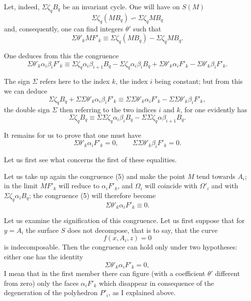 \documentclass{article}
\begin{document}
Let, indeed, $\Sigma \zeta_{q} B_{q}$ be an invariant cycle. One will have on $S(M)$
\[ \Sigma \zeta_{q} (MB_{q}) \backsim \Sigma \zeta_{q} MB_{q} \tag{6} \]
and, consequently, one can find integers $\theta'$ such that
\[ \Sigma \theta'_{k} MF'_{k} \equiv \Sigma \zeta_{q} (MB_{q}) - \Sigma \zeta_{q} MB_{q}. \tag{5} \]

One deduces from this the congruence
\[ \Sigma \theta'_{k} \alpha_{i}\beta_{i}F'_{k} \equiv \Sigma \zeta_{q} \alpha_{i}\beta_{i+1}B_{q} - \Sigma \zeta_{q} \alpha_{i}\beta_{i}B_{q} + \Sigma \theta'_{k} \alpha_{i}F'_{k} - \Sigma \theta'_{k} \beta_{i}F'_{k}. \]

The sign $\Sigma$ refers here to the index $k$, the index $i$ being constant; but from this we can deduce
\[ \Sigma \zeta_{q} B_{q} + \Sigma \Sigma \theta'_{k} \alpha_{i}\beta_{i}F'_{k} \equiv \Sigma \Sigma \theta'_{k} \alpha_{i}F'_{k} - \Sigma \Sigma \theta'_{k} \beta_{i}F'_{k}, \]
the double sign $\Sigma$ then referring to the two indices $i$ and $k$, for one evidently has
\[ \Sigma \zeta_{q} B_{q} \equiv \Sigma \Sigma \zeta_{q} \alpha_{i}\beta_{i}B_{q} - \Sigma \Sigma \zeta_{q} \alpha \beta_{i+1}B_{q}. \]


It remains for us to prove that one must have
\[ \Sigma \theta'_{k} \alpha_{i}F'_{k} = 0, \qquad \Sigma \Sigma \theta'_{k} \beta_{i}F'_{k} = 0. \]

Let us first see what concerns the first of these equalities.

Let us take up again the congruence (5) and make the point $M$ tend towards $A_{i}$; in the limit $MF'_{k}$ will reduce to $\alpha_{i}F'_{k}$, and $\Omega_{i}$ will coincide with $\Omega'_{i}$ and with $\Sigma \zeta_{q} \alpha_{i}B_{q}$; the congruence (5) will therefore become
\[ \Sigma \theta'_{k} \alpha_{i}F'_{k} \equiv 0. \tag{7} \]

Let us examine the signification of this congruence. Let us first suppose that for $y = A_{i}$ the surface $S$ does not decompose, that is to say, that the curve
\[ f(x, A_{i}, z) = 0 \]
is indecomposable. Then the congruence can hold only under two hypotheses: either one has the identity
\[ \Sigma \theta'_{k} \alpha_{i}F'_{k} = 0, \]
I mean that in the first member there can figure (with a coefficient $\theta'$ different from zero) only the faces $\alpha_{i}F'_{k}$ which disappear in consequence of the degeneration of the polyhedron $P'_{i}$, as I explained above.
\end{document}
